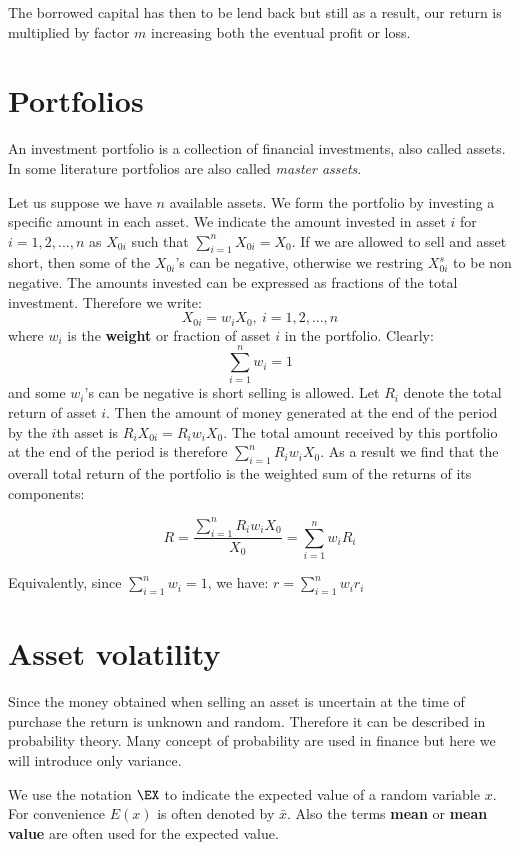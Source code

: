 The borrowed capital has then to be lend back but still as a result, our return is multiplied by factor $m$ increasing both the eventual profit or loss.

\section{Portfolios}
\label{s:portfolios}

An investment portfolio is a collection of financial investments, also called assets. In some literature portfolios are also called \textit{master assets}. 

Let us suppose we have $n$ available assets. We form the portfolio by investing a specific amount in each asset. We indicate the amount invested in asset $i$ for $i=1,2,...,n$ as $X_{0i}$ such that $\sum_{i=1}^n X_{0i} = X_0$.
If we are allowed to sell and asset short, then some of the $X_{0i}$'s can be negative, otherwise we restring $X_{0i}^s$ to be non negative.
The amounts invested can be expressed as fractions of the total investment. Therefore we write:
$$ X_{0i} = w_i X_0, \: i = 1, 2, ..., n$$
where $w_i$ is the \textbf{weight} or fraction of asset $i$ in the portfolio. Clearly:
$$ \sum_{i=1}^n w_i = 1$$
and some $w_i$'s can be negative is short selling is allowed.
Let $R_i$ denote the total return of asset $i$. Then the amount of money generated at the end of the period by the $i$th asset is $R_iX_{0i} = R_i w_i X_0$. The total amount received by this portfolio at the end of the period is therefore $\sum_{i=1}^n R_i w_i X_0$. As a result we find that the overall total return of the portfolio is the weighted sum of the returns of its components:

$$ R = \frac{\sum_{i=1}^{n} R_i w_i X_0}{X_0} = \sum_{i=1}^n w_i R_i $$

Equivalently, since $\sum_{i=1}^n w_i = 1$, we have:
$r=\sum_{i=1}^n w_i r_i$

\section{Asset volatility}
\label{s:asset_volatility}

Since the money obtained when selling an asset is uncertain at the time of purchase the return is unknown and random. Therefore it can be described in probability theory. Many concept of probability are used in finance but here we will introduce only variance.

\hfill \break

We use the notation $\EX$ to indicate the expected value of a random variable $x$. For convenience $E(x)$ is often denoted by $\bar{x}$. Also the terms \textbf{mean} or \textbf{mean value} are often used for the expected value.

